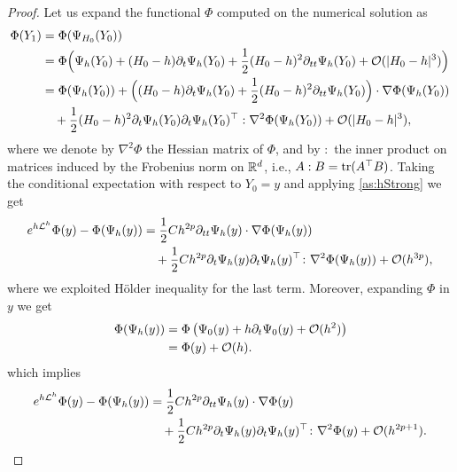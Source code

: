 \documentclass[final,onefignum,onetabnum]{siamonline171218}
\begin{document}
\begin{proof} Let us expand the functional $\Phi$ computed on the numerical solution as
	\begin{equation}
		\begin{aligned}
			\Phi(Y_1) &= \Phi(\Psi_{H_0}(Y_0)) \\
			&= \Phi\Big(\Psi_h(Y_0) + (H_0-h)\partial_t\Psi_h(Y_0) + \frac{1}{2}(H_0-h)^2\partial_{tt}\Psi_h(Y_0) + \mathcal{O}(\lvert H_0 - h\rvert^3)\Big)\\
			&= \Phi(\Psi_h(Y_0)) + \Big((H_0 - h)\partial_t\Psi_h(Y_0)+\frac{1}{2}(H_0-h)^2\partial_{tt}\Psi_h(Y_0)\Big) \cdot \nabla\Phi(\Psi_h(Y_0))\\
			&\quad + \frac{1}{2}(H_0 - h)^2 \partial_t \Psi_h(Y_0) \partial_t \Psi_h(Y_0)^\top : \nabla^2\Phi(\Psi_h(Y_0)) + \mathcal{O}(\lvert H_0 - h\rvert^3),
		\end{aligned}
	\end{equation}
	where we denote by $\nabla^2\Phi$ the Hessian matrix of $\Phi$, and by $:$ the inner product on matrices induced by the Frobenius norm on $\mathbb{R}^d$, i.e., $A : B = \operatorname{tr}(A^\top B)$. Taking the conditional expectation with respect to $Y_0 = y$ and applying \cref{as:hStrong} we get
	\begin{equation}
		\begin{aligned}
			e^{h\mathcal{L}^h}\Phi(y) - \Phi(\Psi_h(y)) &= \frac{1}{2} Ch^{2p}\partial_{tt}\Psi_h(y)\cdot \nabla\Phi(\Psi_h(y))\\
			&\quad + \frac{1}{2} Ch^{2p}\partial_t \Psi_h(y) \partial_t \Psi_h(y)^\top  \colon \nabla^2\Phi(\Psi_h(y)) + \mathcal{O}(h^{3p}),
		\end{aligned}
	\end{equation}
	where we exploited Hölder inequality for the last term. Moreover, expanding $\Phi$ in $y$ we get
	\begin{equation}
		\begin{aligned}
			\Phi(\Psi_h(y)) &= \Phi\left(\Psi_0(y) + h\partial_t \Psi_0(y) + \mathcal{O}(h^2)\right) \\
			&= \Phi(y) + \mathcal{O}(h).
		\end{aligned}
	\end{equation}
	which implies
	\begin{equation}\label{eq:DistanceProbDet}
		\begin{aligned}
			e^{h\diffL^h}\Phi(y) - \Phi(\Psi_h(y)) &= \frac{1}{2} Ch^{2p}\partial_{tt}\Psi_h(y) \cdot \nabla\Phi(y)\\
			&\quad +\frac{1}{2}Ch^{2p}\partial_t \Psi_h(y) \partial_t \Psi_h(y)^\top  \colon \nabla^2\Phi(y) + \OO(h^{2p+1}).

\end{aligned}
\end{equation}
\end{proof}
\end{document}
